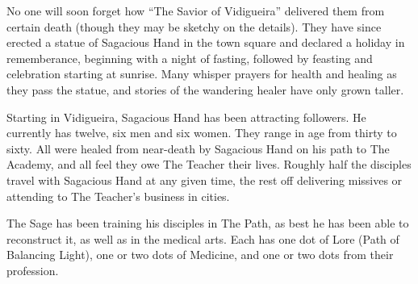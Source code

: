 No one will soon forget how ``The Savior of Vidigueira'' delivered them from
certain death (though they may be sketchy on the details). They have since
erected a statue of Sagacious Hand in the town square and declared a holiday in
rememberance, beginning with a night of fasting, followed by feasting and
celebration starting at sunrise. Many whisper prayers for health and healing as
they pass the statue, and stories of the wandering healer have only grown
taller.




Starting in Vidigueira, Sagacious Hand has been attracting followers. He
currently has twelve, six men and six women. They range in age from thirty to
sixty. All were healed from near-death by Sagacious Hand on his path to The
Academy, and all feel they owe The Teacher their lives. Roughly half the
disciples travel with Sagacious Hand at any given time, the rest off delivering
missives or attending to The Teacher's business in cities.

The Sage has been training his disciples in The Path, as best he has been able
to reconstruct it, as well as in the medical arts. Each has one dot of Lore
(Path of Balancing Light), one or two dots of Medicine, and one or two dots
from their profession.


\printbibliography[title=References]


